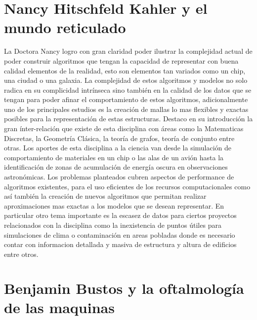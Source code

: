 \documentclass[12pt,letterpaper]{article}
\begin{document}
\section{Nancy Hitschfeld Kahler y el mundo reticulado}

La Doctora Nancy logro con gran claridad poder ilustrar la complejidad actual de poder construir algoritmos que tengan la capacidad de representar con buena calidad elementos de la realidad, esto son elementos tan variados como un chip, una ciudad o una galaxia. La complejidad de estos algoritmos y modelos no solo radica en su complicidad intrínseca sino también en la calidad de los datos que se tengan para poder afinar el comportamiento de estos algoritmos, adicionalmente uno de los principales estudios es la creación de mallas lo mas flexibles y exactas posibles para la representación de estas estructuras\autocite{meshing}.
Destaco en su introducción la gran ínter-relación que existe de esta disciplina con áreas como la Matematicas Discretas, la Geometría Clásica, la teoría de grafos, teoría de conjunto entre otras.
Los aportes de esta disciplina a la ciencia van desde la simulación de comportamiento de materiales en un chip o las alas de un avión hasta la identificación de zonas de acumulación de energía oscura en observaciones astronómicas\autocite{Anillo}.
Los problemas planteados cubren aspectos de performance de algoritmos existentes, para el uso eficientes de los recursos computacionales como así también la creación de nuevos algoritmos que permitan realizar aproximaciones mas exactas a los modelos que se desean representar. En particular otro tema importante es la escasez de datos para ciertos proyectos relacionados con la disciplina como la inexistencia de puntos útiles para simulaciones de clima o contaminación en areas pobladas donde es necesario contar con informacion detallada y masiva de estructura y altura de edificios entre otros.

\section{Benjamin Bustos y la oftalmología de las maquinas}
\end{document}
